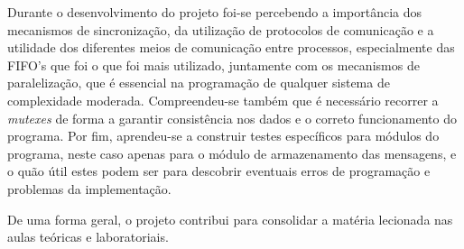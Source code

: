 \documentclass[a4paper]{article}
\begin{document}
	Durante o desenvolvimento do projeto foi-se percebendo a importância dos mecanismos de sincronização, da utilização de protocolos de comunicação e a utilidade dos diferentes meios de comunicação entre processos, especialmente das FIFO's que foi o que foi mais utilizado, juntamente com os mecanismos de paralelização, que é essencial na programação de qualquer sistema de complexidade moderada. Compreendeu-se também que é necessário recorrer a \textit{mutexes} de forma a garantir consistência nos dados e o correto funcionamento do programa. Por fim, aprendeu-se a construir testes específicos para módulos do programa, neste caso apenas para o módulo de armazenamento das mensagens, e o quão útil estes podem ser para descobrir eventuais erros de programação e problemas da implementação. 

	De uma forma geral, o projeto contribui para consolidar a matéria lecionada nas aulas teóricas e laboratoriais.
\end{document}
